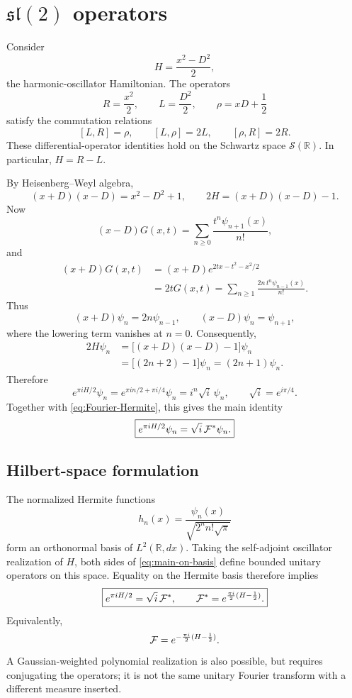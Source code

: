 \documentclass[11pt]{amsart}
\newcommand{\RR}{\mathbb R}
\newcommand{\F}{{\cal F}}
\newcommand{\Fstar}{{\cal F}^{*}}
\begin{document}
\section{$\mathfrak{sl}(2)$ operators}
Consider
\[
H=\frac{x^2-D^2}{2},
\]
the harmonic-oscillator Hamiltonian. The operators
\[
R=\frac{x^2}{2},\qquad L=\frac{D^2}{2},\qquad
\rho=xD+\frac12
\]
satisfy the commutation relations
\begin{equation}\label{eq:commutators}
[L,R]=\rho,\qquad [L,\rho]=2L,\qquad [\rho,R]=2R.
\end{equation}
These differential-operator identities hold on the Schwartz space
$\mathcal S(\RR)$. In particular, $H=R-L$.

By Heisenberg--Weyl algebra,
\[
(x+D)(x-D)=x^2-D^2+1,
\qquad 2H=(x+D)(x-D)-1.
\]
Now
\[
(x-D)G(x,t)=\sum_{n\ge0}\frac{t^n\psi_{n+1}(x)}{n!},
\]
and
\begin{align*}
(x+D)G(x,t)
&=(x+D)e^{2tx-t^2-x^2/2}\\
&=2tG(x,t)
=\sum_{n\ge1}\frac{2n\,t^n\psi_{n-1}(x)}{n!}.
\end{align*}
Thus
\[
(x+D)\psi_n=2n\psi_{n-1},\qquad
(x-D)\psi_n=\psi_{n+1},
\]
where the lowering term vanishes at $n=0$. Consequently,
\begin{align*}
2H\psi_n
&=\bigl[(x+D)(x-D)-1\bigr]\psi_n\\
&=\bigl[(2n+2)-1\bigr]\psi_n
=(2n+1)\psi_n.
\end{align*}
Therefore
\[
e^{\pi iH/2}\psi_n
=e^{\pi in/2+\pi i/4}\psi_n
=i^n\sqrt{i}\,\psi_n,
\qquad \sqrt{i}=e^{i\pi/4}.
\]
Together with \eqref{eq:Fourier-Hermite}, this gives the main identity
\begin{equation}\label{eq:main-on-basis}
\boxed{e^{\pi iH/2}\psi_n=\sqrt{i}\,\Fstar\psi_n.}
\end{equation}

\subsection*{Hilbert-space formulation}
The normalized Hermite functions
\[
h_n(x)=\frac{\psi_n(x)}{\sqrt{2^n n!\sqrt\pi}}
\]
form an orthonormal basis of $L^2(\RR,dx)$. Taking the self-adjoint
oscillator realization of $H$, both sides of
\eqref{eq:main-on-basis} define bounded unitary operators on this
space. Equality on the Hermite basis therefore implies
\begin{equation}\label{eq:main-operator}
\boxed{e^{\pi iH/2}=\sqrt{i}\,\Fstar,\qquad
\Fstar=e^{\frac{\pi i}{2}(H-\frac12)}.}
\end{equation}
Equivalently,
\[
\F=e^{-\frac{\pi i}{2}(H-\frac12)}.
\]
A Gaussian-weighted polynomial realization is also possible, but
requires conjugating the operators; it is not the same unitary
Fourier transform with a different measure inserted.
\end{document}
